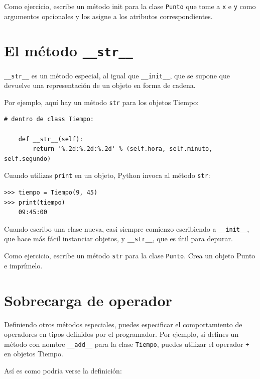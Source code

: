 \documentclass[10pt]{book}
\begin{document}
Como ejercicio, escribe un método init para la clase {\tt Punto} que tome a
{\tt x} e {\tt y} como argumentos opcionales y los asigne
a los atributos correspondientes.


\section{El método {\tt \_\_str\_\_}}

\verb"__str__" es un método especial, al igual que \verb"__init__",
que se supone que devuelve una representación de un objeto en forma de cadena.

Por ejemplo, aquí hay un método {\tt str} para los objetos Tiempo:

\begin{verbatim}
# dentro de class Tiempo:

    def __str__(self):
        return '%.2d:%.2d:%.2d' % (self.hora, self.minuto, self.segundo)
\end{verbatim}
%
Cuando utilizas {\tt print} en un objeto, Python invoca al método {\tt str}:

\begin{verbatim}
>>> tiempo = Tiempo(9, 45)
>>> print(tiempo)
    09:45:00
\end{verbatim}
%
Cuando escribo una clase nueva, casi siempre comienzo escribiendo a
\verb"__init__", que hace más fácil instanciar objetos, y
\verb"__str__", que es útil para depurar.

Como ejercicio, escribe un método {\tt str} para la clase {\tt Punto}.
Crea un objeto Punto e imprímelo.


\section{Sobrecarga de operador}
\label{operator.overloading}

Definiendo otros métodos especiales, puedes especificar el comportamiento
de operadores en tipos definidos por el programador.  Por ejemplo, si defines
un método con nombre \verb"__add__" para la clase {\tt Tiempo}, puedes utilizar el
operador {\tt +} en objetos Tiempo.

Así es como podría verse la definición:
\end{document}
